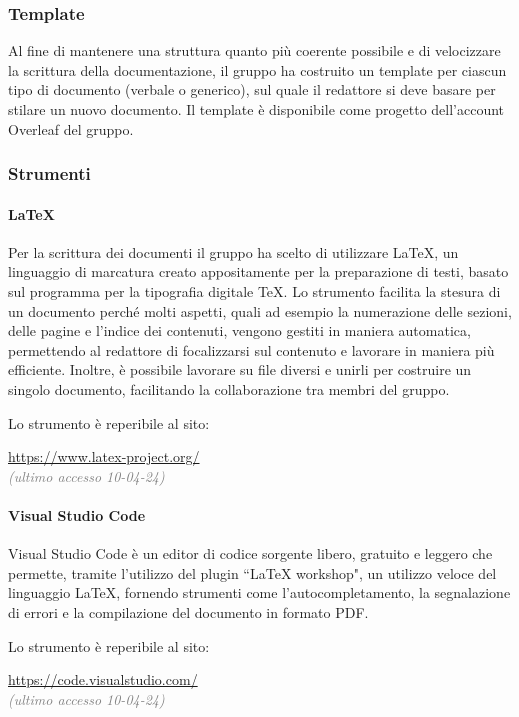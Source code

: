 \subsubsection{Template}
Al fine di mantenere una struttura quanto più coerente possibile e di velocizzare la scrittura della documentazione, il gruppo ha costruito un template per ciascun tipo di documento (verbale o generico), sul quale il redattore si deve basare per stilare un nuovo documento. Il template è disponibile come progetto dell'account Overleaf del gruppo.
\subsubsection{Strumenti}
\paragraph{\LaTeX}
Per la scrittura dei documenti il gruppo ha scelto di utilizzare \LaTeX, un linguaggio di marcatura creato appositamente per la preparazione di testi, basato sul programma per la tipografia digitale \TeX. Lo strumento facilita la stesura di un documento perché molti aspetti, quali ad esempio la numerazione delle sezioni, delle pagine e l'indice dei contenuti, vengono gestiti in maniera automatica, permettendo al redattore di focalizzarsi sul contenuto e lavorare in maniera più efficiente. Inoltre, è possibile lavorare su file diversi e unirli per costruire un singolo documento, facilitando la collaborazione tra membri del gruppo.
\par Lo strumento è reperibile al sito:
\begin{center}
    \url{https://www.latex-project.org/}\\ \textcolor{gray}{\textit{(ultimo accesso 10-04-24)}}
\end{center}
\paragraph{Visual Studio Code}
Visual Studio Code è un editor di codice sorgente libero, gratuito e leggero che permette, tramite l'utilizzo del plugin ``LaTeX workshop", un utilizzo veloce del linguaggio \LaTeX, fornendo strumenti come l'autocompletamento, la segnalazione di errori e la compilazione del documento in formato PDF.
\par Lo strumento è reperibile al sito:
\begin{center}
    \url{https://code.visualstudio.com/}\\ \textcolor{gray}{\textit{(ultimo accesso 10-04-24)}}
\end{center}
